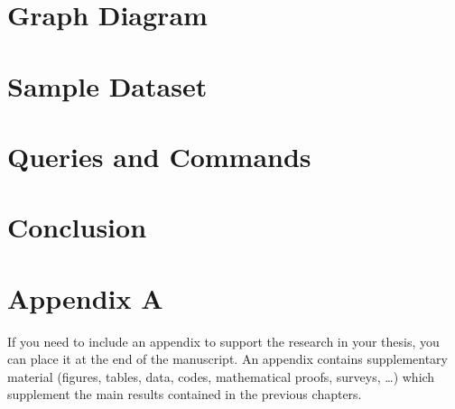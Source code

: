 \documentclass{Configuration_Files/PoliMi3i_thesis}
\begin{document}
\chapter{Graph Diagram}

\chapter{Sample Dataset}

\chapter{Queries and Commands}

\chapter{Conclusion}


\cleardoublepage
{} %
\appendix
\chapter{Appendix A}
If you need to include an appendix to support the research in your thesis, you can place it at the end of the manuscript.
An appendix contains supplementary material (figures, tables, data, codes, mathematical proofs, surveys, \dots)
which supplement the main results contained in the previous chapters.


\listoffigures

\listoftables

\cleardoublepage
\end{document}
